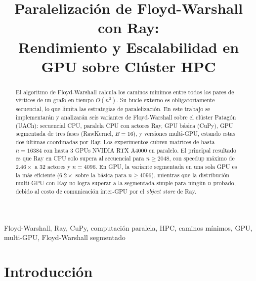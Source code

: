 \documentclass[conference]{IEEEtran}
\newcommand{\FW}{Floyd-Warshall}
\begin{document}
\title{Paralelización de Floyd-Warshall con Ray:\\
Rendimiento y Escalabilidad en GPU sobre Clúster HPC}

\author{
}

\maketitle

\begin{abstract}
El algoritmo de \FW{} calcula los caminos mínimos entre todos los pares
de vértices de un grafo en tiempo $O(n^3)$. Su bucle externo es
obligatoriamente secuencial, lo que limita las estrategias de
paralelización. En este trabajo se implementarán y analizarán seis
variantes de \FW{} sobre el clúster Patagón (UACh): secuencial CPU,
paralela CPU con actores Ray, GPU básica (CuPy), GPU segmentada de
tres fases (RawKernel, $B=16$), y versiones multi-GPU, estando estas
dos últimas coordinadas por Ray. Los experimentos cubren matrices de
hasta $n=16384$ con hasta 3 GPUs NVIDIA RTX A4000 en paralelo. El
principal resultado es que Ray en CPU solo supera al secuencial para
$n \geq 2048$, con speedup máximo de $2.46\times$ a 32 actores y
$n=4096$. En GPU, la variante segmentada en una sola GPU es la más
eficiente ($6.2\times$ sobre la básica para $n \geq 4096$), mientras
que la distribución multi-GPU con Ray no logra superar a la segmentada
simple para ningún $n$ probado, debido al costo de comunicación
inter-GPU por el \textit{object store} de Ray.
\end{abstract}

\begin{IEEEkeywords}
Floyd-Warshall, Ray, CuPy, computación paralela, HPC,
caminos mínimos, GPU, multi-GPU, Floyd-Warshall segmentado
\end{IEEEkeywords}

\section{Introducción}
\end{document}

